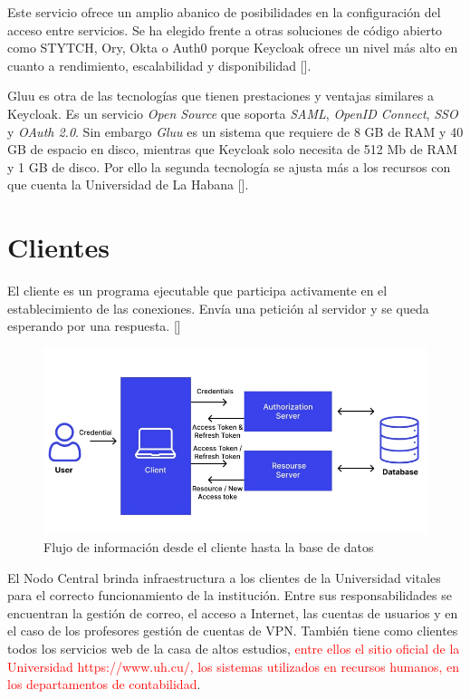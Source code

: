 Este servicio ofrece un amplio abanico de posibilidades en la configuración del acceso entre servicios. Se ha elegido frente a otras soluciones de código abierto como STYTCH, Ory, Okta o Auth0 porque Keycloak ofrece un nivel más alto en cuanto a rendimiento, escalabilidad y disponibilidad [\cite{lobato2022regulacion}]. 

Gluu es otra de las tecnologías que tienen prestaciones y ventajas similares a Keycloak. Es un servicio \textit{Open Source} que soporta \textit{SAML}, \textit{OpenID Connect}, \textit{SSO} y \textit{OAuth 2.0}. Sin embargo \textit{Gluu} es un sistema que requiere de 8 GB de RAM y 40 GB de espacio en disco, mientras que Keycloak solo necesita de 512 Mb de RAM y 1 GB de disco. Por ello la segunda tecnología se ajusta más a los recursos con que cuenta  la Universidad de La Habana [\cite{vassallo2017continuous}].


\section*{Clientes}
El cliente es un programa ejecutable que participa activamente en el establecimiento de las conexiones. Envía una petición al servidor y se queda esperando por una respuesta. [\cite{lizama2016redes}]

\begin{figure}[H]
	\centering
	\includegraphics[width=0.9\linewidth]{Graphics/token-based-auth}
	\caption{Flujo de información desde el cliente hasta la base de datos}
	\label{fig:token-based-auth}
\end{figure}

El Nodo Central brinda infraestructura a los clientes de la Universidad vitales para el correcto funcionamiento de la institución. Entre sus responsabilidades se encuentran la gestión de correo, el acceso a Internet, las cuentas de usuarios y en el caso de los profesores gestión de cuentas de VPN. También tiene como clientes todos los servicios web de la casa de altos estudios, \textcolor{red}{entre ellos el sitio oficial de la Universidad https://www.uh.cu/, los sistemas utilizados en recursos humanos, en los departamentos de contabilidad}.

